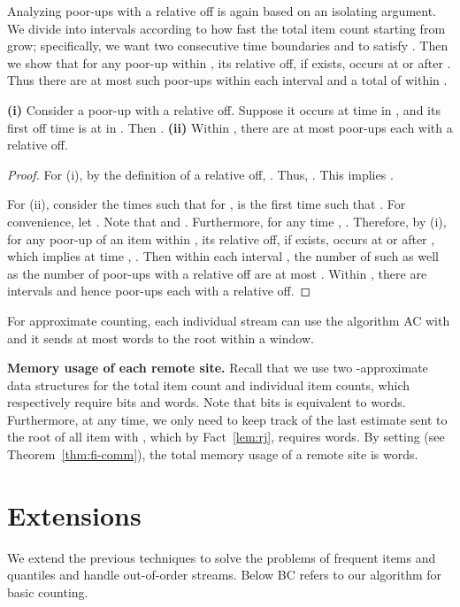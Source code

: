 \documentclass[proceedings]{stacs}
\theoremstyle{definition}\newtheorem{fact}{Fact}
\begin{document}
Analyzing poor-ups with a relative off is again based
on an isolating argument.
We divide  into  intervals
according to how fast the total item count starting from  grow;
specifically, we want two consecutive time boundaries  and 
to satisfy .
Then we  show that for any poor-up  within ,
its relative off, if exists, occurs
at or after .  Thus
there are at most  such poor-ups within each interval
and a total of  within .

\begin{lemma}\label{lem:fi-type2}
{\bf (i)} Consider a poor-up  with a relative off.  Suppose it occurs at time 
in , and its first off time is at  in .
Then .
{\bf (ii)} Within , there are at most  poor-ups each with a relative off.
\end{lemma}

\begin{proof}
For (i), by the definition of a relative off,
.
Thus,
.
This implies
.

For (ii), consider the times 
such that for ,
 is the first time such that
.
For convenience, let .
Note that  and .
Furthermore, for any time ,
.
Therefore, by (i),
for any poor-up of an item  within ,
its relative off, if exists, occurs at or after ,
which implies
at time , .
Then within each interval ,
the number of such  as well as the number of poor-ups with a relative off
are at most .
Within , there are  intervals
and hence 
poor-ups each with a relative off.
\end{proof}








\begin{theorem} \label{thm:fi-comm}
For approximate counting,
each individual stream can use the algorithm AC
with  and
it sends at most  words to the root
within a window.
\end{theorem}

{\bf Memory usage of each remote site.} Recall that we use two -approximate data structures
\cite{DatarGIM02,LeeT06}
for the total item count and individual item counts,
which respectively require
 bits
and  words.
Note that  bits
is equivalent to  words.
Furthermore, at any time,
we only need to keep track of
the last estimate sent to the root of
all item  with ,
which by Fact~\ref{lem:rj}, requires  words.
By setting  (see Theorem~\ref{thm:fi-comm}),
the total memory usage of a remote site
is  words.

\section{Extensions}
\label{sec:extension}
We extend the previous techniques to solve the problems of frequent items
and quantiles and  handle out-of-order streams.
Below BC refers to our algorithm for basic counting.
\end{document}
